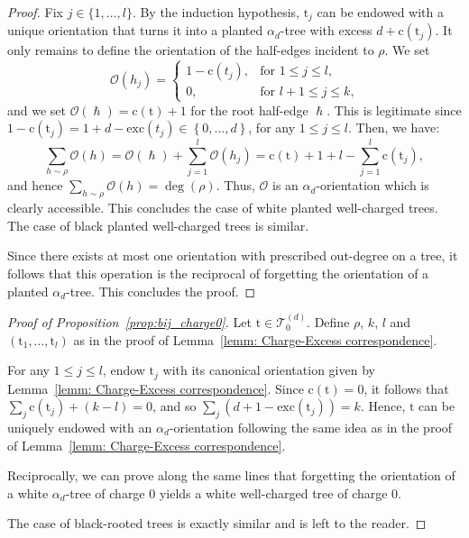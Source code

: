 \documentclass[11pt,reqno,tbtags]{amsart}
\newcommand{\rt}{\mathrm{t}}
\newcommand{\rc}{\mathrm{c}}
\numberwithin{equation}{section}
\numberwithin{theo}{section}
\theoremstyle{definition}
\newcommand{\cO}{\mathcal{O}}
\newcommand{\rh}{\hslash}
\begin{document}
\begin{proof}
Fix $j\in\{1,\ldots,l\}$. By the induction hypothesis, $\rt_j$ can be endowed with a unique orientation that turns it into a planted $\alpha_d$-tree with excess $d+\rc(\rt_j)$. It only remains to define the orientation of the half-edges incident to $\rho$. We set
\begin{equation*}
\cO(h_j) = \begin{cases}
1-\rc(t_j),& \text{for } 1\leq j\leq l\text{,}\\
0, &\text{for }l+1\leq j\leq k\text{,}
\end{cases}
\end{equation*}
and we set $\cO(\rh)=\rc(\rt)+1$ for the root half-edge $\rh$.  This is legitimate since $1-\rc(\rt_j)=1+d-\mathrm{exc}(t_j)\in\left\{0,\ldots,d\right\}$, for any $1\leq j\leq l$. Then, we have: 
\begin{equation*}
	\sum_{h\sim \rho}\cO(h) = \cO(\rh) + \sum_{j=1}^l\cO(h_j) = \rc(\rt) + 1 + l - \sum_{j=1}^l\rc(\rt_j),
\end{equation*}
and hence $\sum_{h\sim \rho}\cO(h)=\deg(\rho)$. Thus, $\cO$ is an $\alpha_d$-orientation which is clearly accessible. This concludes the case of white planted well-charged trees. The case of black planted well-charged trees is similar.

\medskip
Since there exists at most one orientation with prescribed out-degree on a tree, it follows that this operation is the reciprocal of forgetting the orientation of a planted $\alpha_d$-tree. This concludes the proof.
\end{proof}

\begin{proof}[Proof of Proposition~\ref{prop:bij_charge0}]
Let $\rt \in \mathcal{T}^{(d)}_0$. Define $\rho$, $k$, $l$ and $(\rt_1,\ldots,\rt_l)$ as in the proof of Lemma~\ref{lemm: Charge-Excess correspondence}.

For any $1\leq j\leq l$, endow $\rt_j$ with its canonical orientation given by Lemma~\ref{lemm: Charge-Excess correspondence}. Since $\rc(\rt)=0$, it follows that $\sum_j\rc(\rt_j)+(k-l)=0$, and so $\sum_{j}\left(d+1-\mathrm{exc}(\rt_j)\right)=k$. Hence, $\rt$ can be uniquely endowed with an $\alpha_d$-orientation following the same idea as in the proof of Lemma~\ref{lemm: Charge-Excess correspondence}.  

Reciprocally, we can prove along the same lines that forgetting the orientation of a white $\alpha_d$-tree of charge 0 yields a white well-charged tree of charge 0. 

The case of black-rooted trees is exactly similar and is left to the reader. 
\end{proof}
\end{document}
